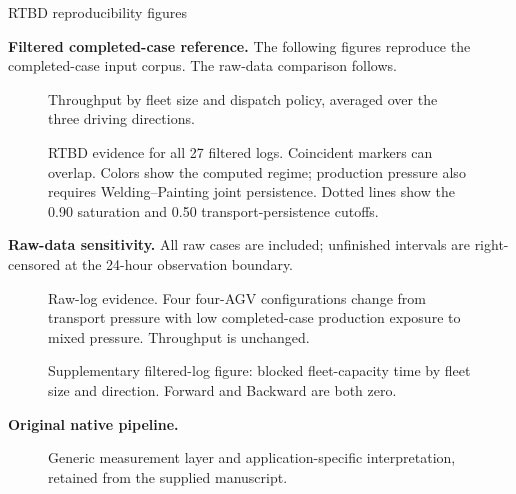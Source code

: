 \documentclass[10pt]{article}
\begin{document}
\begin{center}\large RTBD reproducibility figures\end{center}
\textbf{Filtered completed-case reference.} The following figures reproduce
the completed-case input corpus. The raw-data comparison follows.
\begin{figure}[ht]\centering
\caption{Throughput by fleet size and dispatch policy, averaged over the three driving directions.}\end{figure}
\begin{figure}[ht]\centering
\caption{RTBD evidence for all 27 filtered logs. Coincident markers can overlap. Colors show the computed regime; production pressure also requires Welding--Painting joint persistence. Dotted lines show the 0.90 saturation and 0.50 transport-persistence cutoffs.}\end{figure}
\clearpage
\textbf{Raw-data sensitivity.} All raw cases are included; unfinished
intervals are right-censored at the 24-hour observation boundary.
\renewcommand{\rtbddatadir}{outputs/figure_data/raw}
\begin{figure}[ht]\centering
\caption{Raw-log evidence. Four four-AGV configurations change from transport pressure with low completed-case production exposure to mixed pressure. Throughput is unchanged.}\end{figure}
\renewcommand{\rtbddatadir}{outputs/figure_data}
\begin{figure}[ht]\centering
\caption{Supplementary filtered-log figure: blocked fleet-capacity time by fleet size and direction. Forward and Backward are both zero.}\end{figure}
\clearpage
\textbf{Original native pipeline.}
\begin{figure}[ht]\centering
\caption{Generic measurement layer and application-specific interpretation, retained from the supplied manuscript.}\end{figure}
\end{document}
